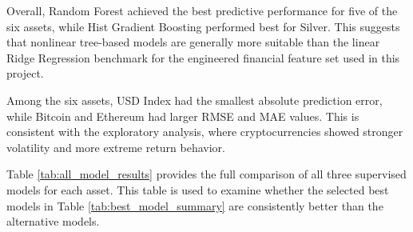 \documentclass[12pt]{article}
\begin{document}
Overall, Random Forest achieved the best predictive performance for five of the six assets, while Hist Gradient Boosting performed best for Silver. This suggests that nonlinear tree-based models are generally more suitable than the linear Ridge Regression benchmark for the engineered financial feature set used in this project.

Among the six assets, USD Index had the smallest absolute prediction error, while Bitcoin and Ethereum had larger RMSE and MAE values. This is consistent with the exploratory analysis, where cryptocurrencies showed stronger volatility and more extreme return behavior.

Table \ref{tab:all_model_results} provides the full comparison of all three supervised models for each asset. This table is used to examine whether the selected best models in Table \ref{tab:best_model_summary} are consistently better than the alternative models.
\end{document}
